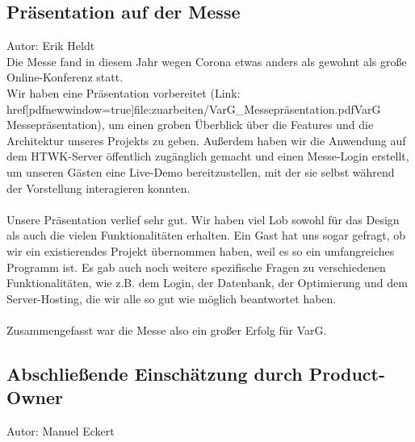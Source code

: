 \documentclass[twoside]{report}
\begin{document}
\subsection{Präsentation auf der Messe}
{\small Autor: Erik Heldt}
\\Die Messe fand in diesem Jahr wegen Corona etwas anders als gewohnt als große Online-Konferenz statt.
\\Wir haben eine Präsentation vorbereitet (Link: href[pdfnewwindow=true]{file:zuarbeiten/VarG_Messepräsentation.pdf}{VarG Messepräsentation}),
um einen groben Überblick über die Features und die Architektur unseres Projekts zu geben. Außerdem haben wir die Anwendung auf dem HTWK-Server öffentlich zugänglich gemacht
und einen Messe-Login erstellt, um unseren Gästen eine Live-Demo bereitzustellen, mit der sie selbst während der Vorstellung interagieren konnten.
\\\\Unsere Präsentation verlief sehr gut. Wir haben viel Lob sowohl für das Design als auch die vielen Funktionalitäten erhalten.
Ein Gast hat uns sogar gefragt, ob wir ein existierendes Projekt übernommen haben, weil es so ein umfangreiches Programm ist.
Es gab auch noch weitere spezifische Fragen zu verschiedenen Funktionalitäten, wie z.B. dem Login, der Datenbank, der Optimierung und dem Server-Hosting,
die wir alle so gut wie möglich beantwortet haben.
\\\\Zusammengefasst war die Messe also ein großer Erfolg für VarG.

\subsection{Abschließende Einschätzung durch Product-Owner}
{\small Autor: Manuel Eckert}
\end{document}
